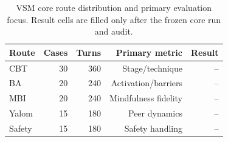 \begin{table}[t]
\centering
\footnotesize
\setlength{\tabcolsep}{3pt}
\begin{tabular}{lrrrr}
\toprule
Route & Cases & Turns & Primary metric & Result \\
\midrule
CBT & 30 & 360 & Stage/technique & -- \\
BA & 20 & 240 & Activation/barriers & -- \\
MBI & 20 & 240 & Mindfulness fidelity & -- \\
Yalom & 15 & 180 & Peer dynamics & -- \\
Safety & 15 & 180 & Safety handling & -- \\
\bottomrule
\end{tabular}
\caption{VSM core route distribution and primary evaluation focus. Result cells are filled only after the frozen core run and audit.}
\label{tab:route_results}
\end{table}

